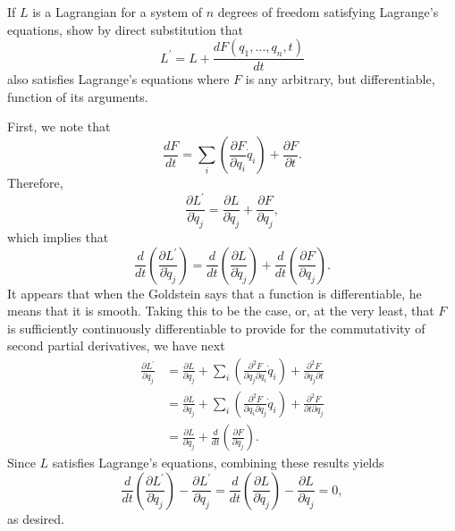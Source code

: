 \begin{questions}
\question If $L$ is a Lagrangian for a system of $n$ degrees of freedom satisfying Lagrange's equations, show by direct substitution that
\[
L^\prime = L + \frac{dF(q_1,\ldots, q_n, t)}{dt}
\]
also satisfies Lagrange's equations where $F$ is any arbitrary, but differentiable, function of its arguments.
\begin{solution}
First, we note that
\[
\frac{dF}{dt} = \sum_i \left( \frac{\partial F}{\partial q_i} \dot{q}_i \right) + \frac{\partial F}{\partial t}.
\]
Therefore,
\[
\frac{\partial L^\prime}{\partial \dot{q}_j} = \frac{\partial L}{\partial \dot{q}_j} + \frac{\partial F}{\partial q_j},
\]
which implies that
\[
\frac{d}{dt} \left( \frac{\partial L^\prime}{\partial \dot{q}_j} \right) = \frac{d}{dt} \left( \frac{\partial L}{\partial \dot{q}_j} \right) + \frac{d}{dt} \left( \frac{\partial F}{\partial q_j} \right).
\]
It appears that when the Goldstein says that a function is differentiable, he means that it is smooth. Taking this to be the case, or, at the very least, that $F$ is sufficiently continuously differentiable to provide for the commutativity of second partial derivatives, we have next
\begin{align*}
\frac{\partial L^\prime}{\partial q_j} &= \frac{\partial L}{\partial q_j} + \sum_i \left( \frac{\partial^2 F}{\partial q_j \partial q_i} \dot{q}_i \right) + \frac{\partial^2 F}{\partial q_j \partial t} \\
&= \frac{\partial L}{\partial q_j} + \sum_i \left( \frac{\partial^2 F}{\partial q_i \partial q_j} \dot{q}_i \right) + \frac{\partial^2 F}{\partial t \partial q_j} \\
&= \frac{\partial L}{\partial q_j} + \frac{d}{dt} \left( \frac{\partial F}{\partial q_j} \right).
\end{align*}
Since $L$ satisfies Lagrange's equations, combining these results yields
\[
\frac{d}{dt} \left( \frac{\partial L^\prime}{\partial \dot{q}_j} \right) - \frac{\partial L^\prime}{\partial q_j} = \frac{d}{dt} \left( \frac{\partial L}{\partial \dot{q}_j} \right) - \frac{\partial L}{\partial q_j} = 0,
\]
as desired. 
\end{solution}


\end{questions}
